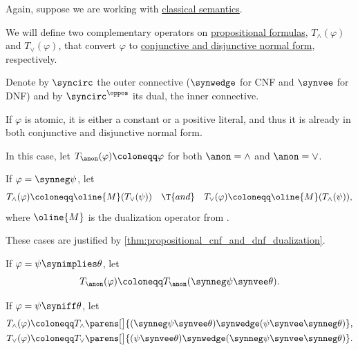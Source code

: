 \begin{algorithm}\label{alg:propositional_formula_to_cnf_or_dnf}
  Again, suppose we are working with \hyperref[def:truth_value_algebra/classical]{classical semantics}.

  We will define two complementary operators on \hyperref[def:propositional_formula]{propositional formulas}, \( T_{\wedge}(\varphi) \) and \( T_{\vee}(\varphi) \), that convert \( \varphi \) to \hyperref[def:propositional_cnf_and_dnf]{conjunctive and disjunctive normal form}, respectively.

  Denote by \( \syncirc \) the outer connective (\( \synwedge \) for CNF and \( \synvee \) for DNF) and by \( \syncirc^\oppos \) its dual, the inner connective.

  \begin{thmenum}
     If \( \varphi \) is atomic, it is either a constant or a positive literal, and thus it is already in both conjunctive and disjunctive normal form.

    In this case, let \( T_{\anon}(\varphi) \coloneqq \varphi \) for both \( {\anon} = \wedge \) and \( {\anon} = \vee \).

     If \( \varphi = \synneg \psi \), let
    \begin{align*}
      T_\wedge(\varphi) \coloneqq \oline{M}(T_\vee(\psi))
      &&
      \T{and}
      &&
      T_\vee(\varphi) \coloneqq \oline{M}(T_\wedge(\psi)),
    \end{align*}
    where \( \oline{M} \) is the dualization operator from .

    These cases are justified by \cref{thm:propositional_cnf_and_dnf_dualization}.

     If \( \varphi = \psi \synimplies \theta \), let
    \begin{equation*}
      T_{\anon}(\varphi) \coloneqq T_{\anon}(\synneg \psi \synvee \theta).
    \end{equation*}

     If \( \varphi = \psi \syniff \theta \), let
    \begin{align*}
      T_\wedge(\varphi) &\coloneqq T_\wedge\parens[\big]{ (\synneg \psi \synvee \theta) \synwedge (\psi \synvee \synneg \theta) }, \\
      T_\vee(\varphi)   &\coloneqq T_\vee\parens[\big]{ (\psi \synvee \theta) \synwedge (\synneg \psi \synvee \synneg \theta) }.
    \end{align*}


\end{thmenum}
\end{algorithm}
